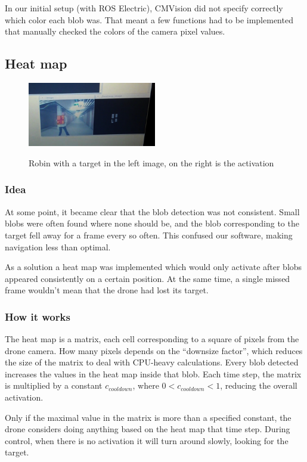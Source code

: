 \documentclass[a4paper,10pt]{article}
\begin{document}
In our initial setup (with ROS Electric), CMVision did not specify correctly
which color each blob was. That meant a few functions had to be implemented that manually checked the colors of the camera pixel values.


\subsection{Heat map}

\begin{figure}[h!]
	\caption{Robin with a target in the left image, on the right is the activation}
	\centering
	\includegraphics[width=0.5\textwidth]{images/robinPresentActivation}
	\label{fig:robinPresentActivation}
\end{figure}


\subsubsection{Idea}
At some point, it became clear that the blob detection was not consistent.
Small blobs were often found where none should be, and the blob corresponding
to the target fell away for a frame every so often. This confused our software,
making navigation less than optimal.

As a solution a heat map was implemented which
would only activate after blobs appeared consistently on a certain position.
At the same time, a single missed frame wouldn't mean that the drone had lost
its target.
\subsubsection{How it works}\label{subsec:howheatmapworks}
The heat map is a matrix, each cell corresponding to a square of
pixels from the drone camera. How many pixels depends on the ``downsize factor'',
which reduces the size of the matrix to deal with CPU-heavy calculations.
Every blob detected increases the
values in the heat map inside that blob. Each time step, the matrix is
multiplied by a constant $c_{{cooldown}}$, where
$0 < c_{{cooldown}} < 1$, reducing the overall
activation.

Only if the maximal value in the matrix is more than a specified constant,
the drone considers doing anything based on the heat map that time step.
During control, when there is no activation it will turn around slowly, looking for the target.
\end{document}
